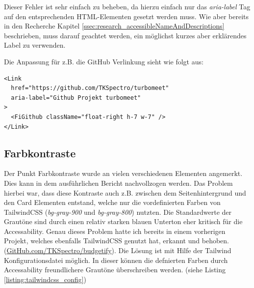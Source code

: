 Dieser Fehler ist sehr einfach zu beheben, da hierzu einfach nur das \emph{aria-label} Tag auf den entsprechenden HTML-Elementen gesetzt werden muss.
Wie aber bereits in den Recherche Kapitel \ref{ssec:research_accessibleNameAndDescriptions} beschrieben, muss darauf geachtet werden, ein möglichst kurzes aber erklärendes Label zu verwenden.

Die Anpassung für z.B. die GitHub Verlinkung sieht wie folgt aus:

\begin{lstlisting}
<Link
  href="https://github.com/TKSpectro/turbomeet"
  aria-label="Github Projekt turbomeet"
>
  <FiGithub className="float-right h-7 w-7" />
</Link>
\end{lstlisting}

\subsection{Farbkontraste}

Der Punkt Farbkontraste wurde an vielen verschiedenen Elementen angemerkt. Dies kann in dem ausführlichen Bericht nachvollzogen werden. Das Problem hierbei war, dass diese Kontraste auch z.B. zwischen dem Seitenhintergrund und den Card Elementen entstand, welche nur die vordefinierten Farben von TailwindCSS (\emph{bg-gray-900} und \emph{bg-gray-800}) nutzten. Die Standardwerte der Grautöne sind durch einen relativ starken blauen Unterton eher kritisch für die Accessability. Genau dieses Problem hatte ich bereits in einem vorherigen Projekt, welches ebenfalls TailwindCSS genutzt hat, erkannt und behoben. (\href{https://github.com/TKSpectro/budgetify}{GitHub.com/TKSpectro/budgetify}). Die Lösung ist mit Hilfe der Tailwind Konfigurationsdatei möglich. In dieser können die defnierten Farben durch Accessability freundlichere Grautöne überschreiben werden. (siehe Listing \ref{listing:tailwindcss_config})